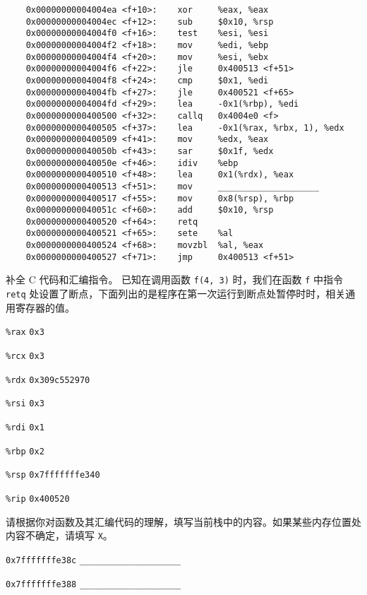 \begin{problems}
\begin{verbatim}
    0x00000000004004ea <f+10>:    xor     %eax, %eax
    0x00000000004004ec <f+12>:    sub     $0x10, %rsp
    0x00000000004004f0 <f+16>:    test    %esi, %esi
    0x00000000004004f2 <f+18>:    mov     %edi, %ebp
    0x00000000004004f4 <f+20>:    mov     %esi, %ebx
    0x00000000004004f6 <f+22>:    jle     0x400513 <f+51>
    0x00000000004004f8 <f+24>:    cmp     $0x1, %edi
    0x00000000004004fb <f+27>:    jle     0x400521 <f+65>
    0x00000000004004fd <f+29>:    lea     -0x1(%rbp), %edi
    0x0000000000400500 <f+32>:    callq   0x4004e0 <f>
    0x0000000000400505 <f+37>:    lea     -0x1(%rax, %rbx, 1), %edx
    0x0000000000400509 <f+41>:    mov     %edx, %eax
    0x000000000040050b <f+43>:    sar     $0x1f, %edx
    0x000000000040050e <f+46>:    idiv    %ebp
    0x0000000000400510 <f+48>:    lea     0x1(%rdx), %eax
    0x0000000000400513 <f+51>:    mov     ____________________
    0x0000000000400517 <f+55>:    mov     0x8(%rsp), %rbp
    0x000000000040051c <f+60>:    add     $0x10, %rsp
    0x0000000000400520 <f+64>:    retq
    0x0000000000400521 <f+65>:    sete    %al
    0x0000000000400524 <f+68>:    movzbl  %al, %eax
    0x0000000000400527 <f+71>:    jmp     0x400513 <f+51>
        \end{verbatim}
        \qn 补全 C 代码和汇编指令。
        \qn 已知在调用函数 \verb|f(4, 3)| 时，我们在函数 \verb|f| 中指令 \verb|retq| 处设置了断点，下面列出的是程序在第一次运行到断点处暂停时时，相关通用寄存器的值。
        \begin{compactdesc}
            \item[\texttt{\%rax}] \verb|0x3|
            \item[\texttt{\%rcx}] \verb|0x3|
            \item[\texttt{\%rdx}] \verb|0x309c552970|
            \item[\texttt{\%rsi}] \verb|0x3|
            \item[\texttt{\%rdi}] \verb|0x1|
            \item[\texttt{\%rbp}] \verb|0x2|
            \item[\texttt{\%rsp}] \verb|0x7fffffffe340|
            \item[\texttt{\%rip}] \verb|0x400520|
        \end{compactdesc}
        请根据你对函数及其汇编代码的理解，填写当前栈中的内容。如果某些内存位置处内容不确定，请填写 \verb|X|。
        \begin{compactdesc}
            \item[\texttt{0x7fffffffe38c}] \verb|____________________|
            \item[\texttt{0x7fffffffe388}] \verb|____________________|

\end{compactdesc}
\end{problems}
